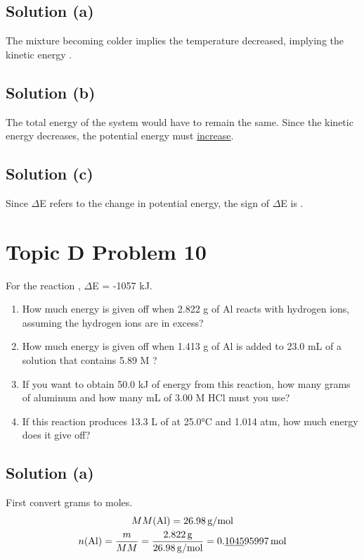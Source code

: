 \documentclass[10pt]{article}
\newcommand{\U}[1]{\underline{#1}}
\begin{document}
        \subsection{Solution (a)}
            The mixture becoming colder implies the temperature decreased, implying the kinetic energy . 
        
        \subsection{Solution (b)}
            The total energy of the system would have to remain the same. 
            Since the kinetic energy decreases, the potential energy must \U{increase}. 

        \subsection{Solution (c)}
            Since $\Delta$E refers to the change in potential energy, the sign of $\Delta$E is . 

    \pagebreak
    \section{Topic D Problem 10}
        For the reaction , $\Delta$E = -1057 kJ.
        \begin{enumerate} [label=\alph*)]
            \item   How much energy is given off when 2.822 g of Al reacts with hydrogen ions, assuming the hydrogen ions are in excess?
            \item   How much energy is given off when 1.413 g of Al is added to 23.0 mL of a solution that contains 5.89 M ?
            \item   If you want to obtain 50.0 kJ of energy from this reaction, how many grams of aluminum and how many mL of 3.00 M HCl must you use?
            \item   If this reaction produces 13.3 L of  at 25.0\unit{\celsius} and 1.014 atm, how much energy does it give off?
        \end{enumerate}
        
        \subsection{Solution (a)}
            First convert grams to moles.
            \begin{gather}
                MM(\rm Al)  =   26.98\,\unit{\gram/\mole}\\
                n({\rm Al}) =   \frac{m}{MM}
                    =   \frac{2.822\,\unit{\gram}}{26.98\,\unit{\gram/\mole}}
                    =   0.\U{1045}95997\,\unit{\mole}
            \end{gather}
\end{document}
